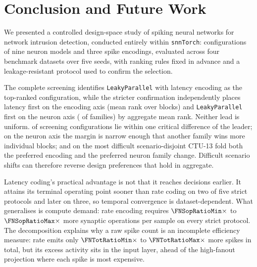 %

\section{Conclusion and Future Work}

We presented a controlled design-space study of spiking neural networks for
network intrusion detection, conducted entirely within \texttt{snnTorch}:
\FNScrVariants{} configurations of nine neuron models and three spike encodings,
evaluated across four benchmark datasets over five seeds, with ranking rules
fixed in advance and a leakage-resistant protocol used to confirm the selection.

The complete screening identifies \texttt{LeakyParallel} with latency encoding
as the top-ranked configuration, while the stricter confirmation independently
places latency first on the encoding axis (mean rank \FNEncRank{} over
\FNEncBlocks{} blocks) and \texttt{LeakyParallel} first on the neuron axis
(\FNNeuRank{} of \FNNeuLevels{} families) by aggregate mean rank. Neither lead
is uniform. \FNScrWithinCD{} of \FNScrVariants{} screening configurations lie
within one critical difference of the leader; on the neuron axis the margin is
narrow enough that another family wins more individual blocks; and on the most
difficult scenario-disjoint CTU-13 fold both the preferred encoding and the
preferred neuron family change. Difficult scenario shifts can therefore reverse
design preferences that hold in aggregate.

Latency coding's practical advantage is not that it reaches decisions earlier.
It attains its terminal operating point sooner than rate coding on two of five
strict protocols and later on three, so temporal convergence is
dataset-dependent. What generalises is compute demand: rate encoding requires
$\FNSopRatioMin\times$ to $\FNSopRatioMax\times$ more synaptic operations per
sample on every strict protocol. The decomposition explains why a raw spike
count is an incomplete efficiency measure: rate emits only
$\FNTotRatioMin\times$ to $\FNTotRatioMax\times$ more spikes in total, but its
excess activity sits in the input layer, ahead of the high-fanout projection
where each spike is most expensive.

